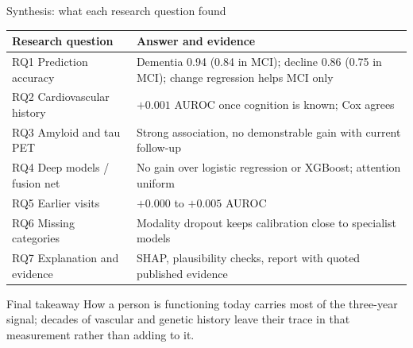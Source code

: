 \documentclass[aspectratio=169,11pt]{beamer}
\begin{document}
\begin{frame}{Synthesis: what each research question found}
\footnotesize
\begin{tabularx}{\textwidth}{@{}p{4.2cm}Y@{}}
\toprule
Research question & Answer and evidence \\
\midrule
RQ1 Prediction accuracy & Dementia 0.94 (0.84 in MCI); decline 0.86 (0.75 in MCI); change regression helps MCI only \\
RQ2 Cardiovascular history & $+0.001$ AUROC once cognition is known; Cox agrees \\
RQ3 Amyloid and tau PET & Strong association, no demonstrable gain with current follow-up \\
RQ4 Deep models / fusion net & No gain over logistic regression or XGBoost; attention uniform \\
RQ5 Earlier visits & $+0.000$ to $+0.005$ AUROC \\
RQ6 Missing categories & Modality dropout keeps calibration close to specialist models \\
RQ7 Explanation and evidence & SHAP, plausibility checks, report with quoted published evidence \\
\bottomrule
\end{tabularx}
\begin{block}{Final takeaway}
How a person is functioning today carries most of the three-year signal; decades of vascular and genetic history leave their trace in that measurement rather than adding to it.
\end{block}
\end{frame}
\end{document}
